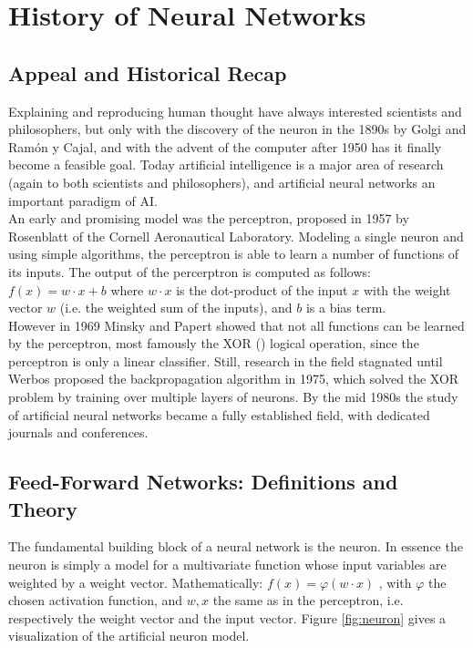 \documentclass[12pt,oneside]{CUNY_CS_PhD}
\begin{document}
\tableofcontents

\mainmatter

\chapter{History of Neural Networks}
\section{Appeal and Historical Recap}
Explaining and reproducing human thought have always interested scientists and philosophers, but only with the discovery of the neuron in the 1890s by Golgi and Ram\'{o}n y Cajal, and with the advent of the computer after 1950 has it finally become a feasible goal. Today artificial intelligence is a major area of research (again to both scientists and philosophers), and artificial neural networks an important paradigm of AI.\\
An early and promising model was the perceptron, proposed in 1957 by Rosenblatt \cite{rosenblatt_perceptron_1957} of the Cornell Aeronautical Laboratory. Modeling a single neuron and using simple algorithms, the perceptron is able to learn a number of functions of its inputs. The output of the percerptron is computed as follows: $f(x) = w \cdot x + b$ where $w \cdot x$ is the dot-product of the input $x$ with the weight vector $w$ (i.e. the weighted sum of the inputs), and $b$ is a bias term.\\
However in 1969 Minsky and Papert \cite{minsky_perceptrons_1969} showed that not all functions can be learned by the perceptron, most famously the XOR () logical operation, since the perceptron is only a linear classifier. Still, research in the field stagnated until Werbos proposed the backpropagation algorithm in 1975, which solved the XOR problem by training over multiple layers of neurons. By the mid 1980s the study of artificial neural networks became a fully established field, with dedicated journals and conferences.

\section{Feed-Forward Networks: Definitions and Theory}
The fundamental building block of a neural network is the neuron. In essence the neuron is simply a model for a multivariate function whose input variables are weighted by a weight vector. Mathematically: $f(x) = \varphi(w \cdot x)$ , with $\varphi$ the chosen activation function, and $w,x$ the same as in the perceptron, i.e. respectively the weight vector and the input vector. Figure \ref{fig:neuron} gives a visualization of the artificial neuron model.\\
\end{document}
